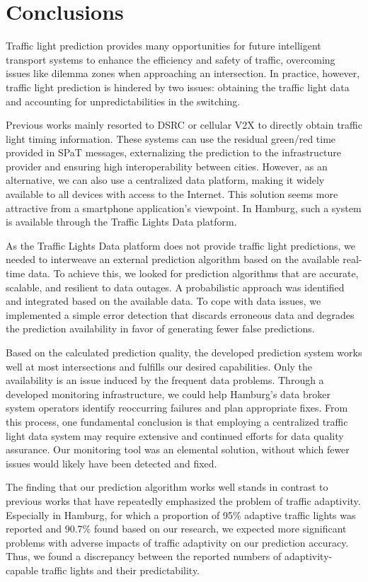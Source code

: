 \section{Conclusions}

Traffic light prediction provides many opportunities for future intelligent transport systems to enhance the efficiency and safety of traffic, overcoming issues like dilemma zones when approaching an intersection. In practice, however, traffic light prediction is hindered by two issues: obtaining the traffic light data and accounting for unpredictabilities in the switching. 

Previous works mainly resorted to DSRC or cellular V2X to directly obtain traffic light timing information. These systems can use the residual green/red time provided in SPaT messages, externalizing the prediction to the infrastructure provider and ensuring high interoperability between cities. However, as an alternative, we can also use a centralized data platform, making it widely available to all devices with access to the Internet. This solution seems more attractive from a smartphone application's viewpoint. In Hamburg, such a system is available through the Traffic Lights Data platform.

As the Traffic Lights Data platform does not provide traffic light predictions, we needed to interweave an external prediction algorithm based on the available real-time data. To achieve this, we looked for prediction algorithms that are accurate, scalable, and resilient to data outages. A probabilistic approach was identified and integrated based on the available data. To cope with data issues, we implemented a simple error detection that discards erroneous data and degrades the prediction availability in favor of generating fewer false predictions. 

Based on the calculated prediction quality, the developed prediction system works well at most intersections and fulfills our desired capabilities. Only the availability is an issue induced by the frequent data problems. Through a developed monitoring infrastructure, we could help Hamburg's data broker system operators identify reoccurring failures and plan appropriate fixes. From this process, one fundamental conclusion is that employing a centralized traffic light data system may require extensive and continued efforts for data quality assurance. Our monitoring tool was an elemental solution, without which fewer issues would likely have been detected and fixed.

The finding that our prediction algorithm works well stands in contrast to previous works that have repeatedly emphasized the problem of traffic adaptivity. Especially in Hamburg, for which a proportion of 95\% adaptive traffic lights was reported \cite{bodenheimer_enabling_2014} and 90.7\% found based on our research, we expected more significant problems with adverse impacts of traffic adaptivity on our prediction accuracy. Thus, we found a discrepancy between the reported numbers of adaptivity-capable traffic lights and their predictability. 

